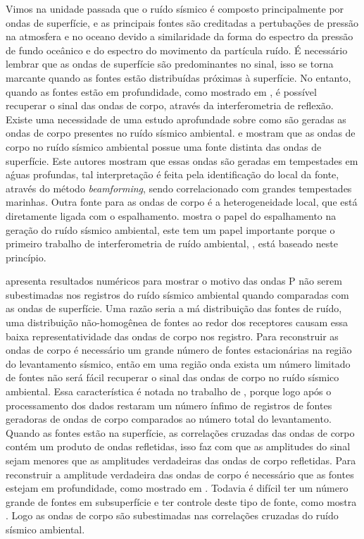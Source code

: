 \documentclass[paper,twocolumn]{geophysics}
\begin{document}
Vimos na unidade passada que o ruído sísmico é composto principalmente por ondas de superfície, e as principais fontes são creditadas a pertubações de pressão na atmosfera e no oceano devido a similaridade da forma do espectro da pressão de fundo oceânico e do espectro do movimento da partícula ruído. É necessário lembrar que as ondas de superfície são predominantes no sinal, isso se torna marcante quando as fontes estão distribuídas próximas à superfície. No entanto, quando as fontes estão em profundidade, como mostrado em \cite{wapenaar_tutorial_2010}, é possível recuperar o sinal das ondas de corpo, através da interferometria de reflexão. Existe uma necessidade de uma estudo aprofundade sobre como são geradas as ondas de corpo presentes no ruído sísmico ambiental. \cite{gerstoft_global_2008} e \cite{gualtieri_modelling_2014} mostram que as ondas de corpo no ruído sísmico ambiental possue uma fonte distinta das ondas de superfície. Este autores mostram que essas ondas são geradas em tempestades em aǵuas profundas, tal interpretação é feita pela identificação do local da fonte, através do método \textit{beamforming}, sendo correlacionado com grandes tempestades marinhas. Outra fonte para as ondas de corpo é a heterogeneidade  local, que está diretamente ligada com o espalhamento. \cite{larose_fluctuations_2008} mostra o papel do espalhamento na geração do ruído sísmico ambiental, este tem um papel importante porque o primeiro trabalho de interferometria de ruído ambiental, \cite{campillo_long-range_2003}, está baseado neste princípio.

\cite{forghani_underestimation_2010} apresenta resultados numéricos para mostrar o motivo das ondas P não serem subestimadas nos registros do ruído sísmico ambiental quando comparadas com as ondas de superfície. Uma razão seria a má distribuição das fontes de ruído, uma distribuição não-homogênea de fontes ao redor dos receptores causam essa baixa representatividade das ondas de corpo nos registro. Para reconstruir as ondas de corpo é necessário um grande número de fontes estacionárias na região do levantamento sísmico, então em uma região onda exista um número limitado de fontes não será fácil recuperar o sinal das ondas de corpo no ruído sísmico ambiental. Essa característica é notada no trabalho de \cite{vidal_retrieval_2014}, porque logo após o processamento dos dados restaram um número ínfimo de registros de fontes geradoras de ondas de corpo comparados ao número total do levantamento. Quando as fontes estão na superfície, as correlações cruzadas das ondas de corpo contém um produto de ondas refletidas, isso faz com que as amplitudes do sinal sejam menores que as amplitudes verdadeiras das ondas de corpo refletidas. Para reconstruir a amplitude verdadeira das ondas de corpo é necessário que as fontes estejam em profundidade, como mostrado em \cite{wapenaar_tutorial_2010}. Todavia é difícil ter um número grande de fontes em subsuperfície e ter controle deste tipo de fonte, como mostra \cite{vidal_retrieval_2014}. Logo as ondas de corpo são subestimadas nas correlações cruzadas do ruído sísmico ambiental. 
\end{document}
